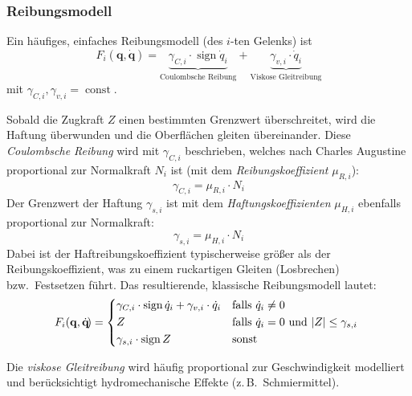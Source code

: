 \documentclass[a4paper, 11pt, accentcolor = tud3b]{tudreport}
\DeclareMathOperator{\const}{const}
\DeclareMathOperator{\sign}{sign}
\renewcommand{\vec}[1]{\boldsymbol{\mathbf{#1}}}
\newcommand{\bzw}{bzw.~}
\newcommand{\zB}{z.\,B.~}
\begin{document}
				\subsubsection{Reibungsmodell}
					Ein häufiges, einfaches Reibungsmodell (des \(i\)-ten Gelenks) ist
					\begin{equation*}
						F_i(\vec{q}, \dot{\vec{q}}\!) = \underbrace{\gamma_{C, i} \cdot \sign \dot{q}_i}_\text{Coulombsche Reibung} + \underbrace{\gamma_{v, i} \cdot \dot{q}_i}_\text{Viskose Gleitreibung}
					\end{equation*}
					mit \( \gamma_{C, i}, \gamma_{v, i} = \const \).
					
					Sobald die Zugkraft \(Z\) einen bestimmten Grenzwert überschreitet, wird die Haftung überwunden und die Oberflächen gleiten übereinander. Diese \emph{Coulombsche Reibung} wird mit \( \gamma_{C, i} \) beschrieben, welches nach Charles Augustine proportional zur Normalkraft \( N_i \) ist (mit dem \emph{Reibungskoeffizient} \( \mu_{R, i} \)):
					\begin{equation*}
						\gamma_{C, i} = \mu_{R, i} \cdot N_i
					\end{equation*}
					Der Grenzwert der Haftung \( \gamma_{s, i} \) ist mit dem \emph{Haftungskoeffizienten} \( \mu_{H, i} \) ebenfalls proportional zur Normalkraft:
					\begin{equation*}
						\gamma_{s, i} = \mu_{H, i} \cdot N_i
					\end{equation*}
					Dabei ist der Haftreibungskoeffizient typischerweise größer als der Reibungskoeffizient, was zu einem ruckartigen Gleiten (Losbrechen) \bzw Festsetzen führt. Das resultierende, klassische Reibungsmodell lautet:
					\begin{equation*}
						F_i(\vec{q}, \dot{\vec{q}}\!) =
							\begin{cases*}
								\gamma_{C, i} \cdot \sign \dot{q}_i + \gamma_{v, i} \cdot \dot{q}_i & falls \( \dot{q}_i \neq 0 \) \\
								Z                                                                   & falls \( \dot{q}_i = 0 \) und \( \lvert Z \rvert \leq \gamma_{s, i} \) \\
								\gamma_{s, i} \cdot \sign Z                                         & sonst
							\end{cases*}
					\end{equation*}
					
					Die \emph{viskose Gleitreibung} wird häufig proportional zur Geschwindigkeit modelliert und berücksichtigt hydromechanische Effekte (\zB Schmiermittel).
					
\end{document}
